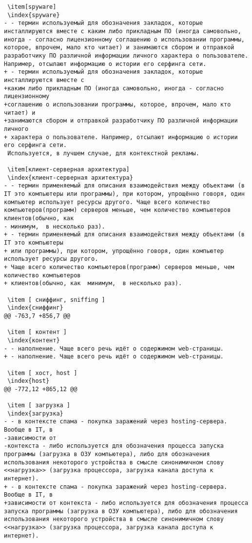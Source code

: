 \begin{verbatim}
 \item[spyware]
 \index{spyware}
- - термин используемый для обозначения закладок, которые инсталлируются вместе с каким либо прикладным ПО (иногда самовольно, иногда - согласно лицензионному соглашению о использовании программы, которое, впрочем, мало кто читает) и занимаются сбором и отправкой разработчику ПО различной информации личного характера о пользователе. Например, отсылают информацию о истории его серфинга сети.
+ - термин используемый для обозначения закладок, которые инсталлируются вместе с
+каким либо прикладным ПО (иногда самовольно, иногда - согласно лицензионному
+соглашению о использовании программы, которое, впрочем, мало кто читает) и
+занимаются сбором и отправкой разработчику ПО различной информации личного
+ характера о пользователе. Например, отсылают информацию о истории его серфинга сети.
 Используется, в лучшем случае, для контекстной рекламы.

 \item[клиент-серверная архитектура]
 \index{клиент-серверная архитектура}
- - термин применяемый для описания взаимодействия между объектами (в IT это компьютеры или программы), при котором, упрощённо говоря, один компьютер использует ресурсы другого. Чаще всего количество компьютеров(программ) серверов меньше, чем количество компьютеров клиентов(обычно, как
- минимум,  в несколько раз).
+ - термин применяемый для описания взаимодействия между объектами (в IT это компьютеры
+ или программы), при котором, упрощённо говоря, один компьютер использует ресурсы другого.
+ Чаще всего количество компьютеров(программ) серверов меньше, чем количество компьютеров
+ клиентов(обычно, как  минимум,  в несколько раз).

 \item [ сниффинг, sniffing ]
 \index{сниффинг}
@@ -763,7 +856,7 @@

 \item [ контент ]
 \index{контент}
- - наполнение. Чаще всего речь идёт о содержимом web-страницы.
+ - наполнение. Чаще всего речь идёт о содержимом web-страницы.

 \item [ хост, host ]
 \index{host}
@@ -772,12 +865,12 @@

 \item [ загрузка ]
 \index{загрузка}
- - в контексте спама - покупка заражений через hosting-сервера. Вообще в IT, в
-зависимости от
-контекста - либо используется для обозначения процесса запуска программы (загрузка в ОЗУ компьютера), либо для обозначения использования некоторого устройства в смысле синонимичном слову <<нагрузка>> (загрузка процессора, загрузка канала доступа к интернет).
+ - в контексте спама - покупка заражений через hosting-сервера. Вообще в IT, в
+зависимости от контекста - либо используется для обозначения процесса запуска программы (загрузка в ОЗУ компьютера), либо для обозначения использования некоторого устройства в смысле синонимичном слову <<нагрузка>> (загрузка процессора, загрузка канала доступа к интернет).


\end{verbatim}
